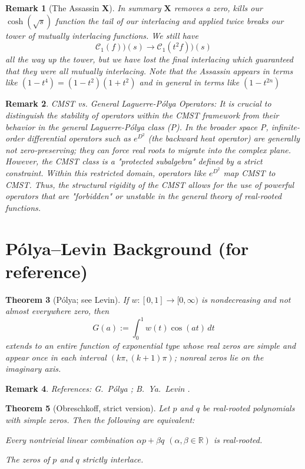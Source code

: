 \documentclass[11pt]{article}
\theoremstyle{breakdef}
\newtheorem{theorem}{Theorem}[section]
\newtheorem{remark}[theorem]{Remark}
\newcommand{\Assassin}{\textbf{X}}
\begin{document}
\begin{remark}[The Assassin \Assassin]
In summary $\Assassin$ removes a zero, kills our $\cosh \left(\sqrt{s}\right)$ function the tail of our interlacing and applied twice breaks our tower of mutually interlacing functions.  We still have 
\begin{equation}
\mathcal{C}_{1}({f}))(s) \to \mathcal{C}_{1}({t^2 f}))(s)
\end{equation}
all the way up the tower, but we have lost the final interlacing which guaranteed that they were all mutually interlacing.
Note that the Assassin appears in terms like $(1-t^4) = (1-t^2)(1+t^2)$ and in general in terms like $(1-t^{2n})$
\end{remark}

\begin{remark}
CMST vs. General Laguerre-Pólya Operators: It is crucial to distinguish the stability of operators within the CMST framework from their behavior in the general Laguerre-Pólya class (P). In the broader space P, infinite-order differential operators such as $e^{D^2}$ (the backward heat operator) are generally not zero-preserving; they can force real roots to migrate into the complex plane. However, the CMST class is a "protected subalgebra" defined by a strict constraint. Within this restricted domain, operators like $e^{D^2}$ map CMST to CMST. Thus, the structural rigidity of the CMST allows for the use of powerful operators that are "forbidden" or unstable in the general theory of real-rooted functions.
\end{remark}

\section*{P\'olya--Levin Background (for reference)}
\begin{theorem}[P\'olya; see Levin]\label{thm:Polya}
If $w:[0,1]\to[0,\infty)$ is nondecreasing and not almost everywhere zero, then
\begin{equation}
G(a):=\int_0^1 w(t)\cos(a t)\,dt
\end{equation}
extends to an entire function of exponential type whose real zeros are simple and appear once in each interval $(k\pi,(k+1)\pi)$; nonreal zeros lie on the imaginary axis.
\end{theorem}

\begin{remark}
References: G.\ P\'olya \cite{polya1918,Polya1927}; B.\ Ya.\ Levin \cite[Chapter II, Thm.\ 7]{Levin1996}.
\end{remark}
\begin{theorem}[Obreschkoff, strict version]
Let $p$ and $q$ be real-rooted polynomials with simple zeros. Then the following are equivalent:


    \item Every nontrivial linear combination $\alpha p + \beta q$ $(\alpha,\beta \in \mathbb{R})$ 
    is
     real-rooted.
     
    \item The zeros of $p$ and $q$ strictly interlace.
\end{theorem}
\end{document}
